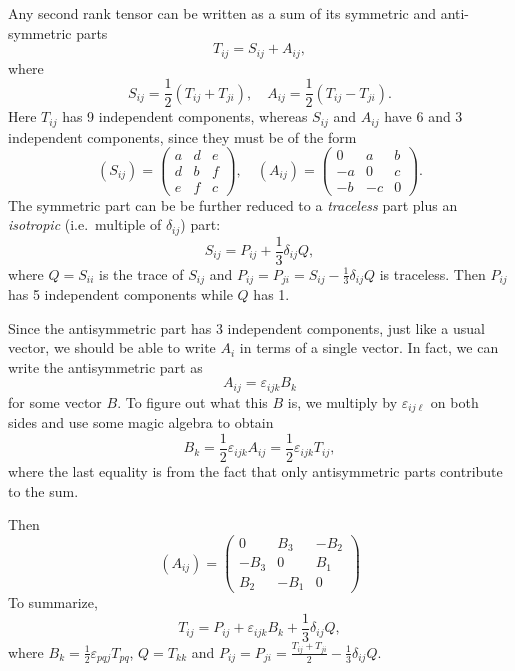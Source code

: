 \documentclass[a4paper]{article}
\begin{document}
Any second rank tensor can be written as a sum of its symmetric and anti-symmetric parts
\[
  T_{ij} = S_{ij} + A_{ij},
\]
where
\[
  S_{ij} = \frac{1}{2}(T_{ij} + T_{ji}),\quad A_{ij} = \frac{1}{2}(T_{ij} - T_{ji}).
\]
Here $T_{ij}$ has 9 independent components, whereas $S_{ij}$ and $A_{ij}$ have 6 and 3 independent components, since they must be of the form
\[
  (S_{ij}) =
  \begin{pmatrix}
    a & d & e\\
    d & b & f\\
    e & f & c
  \end{pmatrix}
  ,\quad
  (A_{ij}) =
  \begin{pmatrix}
    0 & a & b\\
    -a & 0 & c\\
    -b & -c & 0
  \end{pmatrix}.
\]
The symmetric part can be be further reduced to a \emph{traceless} part plus an \emph{isotropic} (i.e.\ multiple of $\delta_{ij}$) part:
\[
  S_{ij} = P_{ij} + \frac{1}{3}\delta_{ij} Q,
\]
where $Q = S_{ii}$ is the trace of $S_{ij}$ and $P_{ij} = P_{ji} = S_{ij} -\frac{1}{3}\delta_{ij}Q$ is traceless. Then $P_{ij}$ has 5 independent components while $Q$ has 1.

Since the antisymmetric part has 3 independent components, just like a usual vector, we should be able to write $A_{i}$ in terms of a single vector. In fact, we can write the antisymmetric part as
\[
  A_{ij} = \varepsilon_{ijk}B_k
\]
for some vector $B$. To figure out what this $B$ is, we multiply by $\varepsilon_{ij\ell}$ on both sides and use some magic algebra to obtain
\[
  B_k = \frac{1}{2}\varepsilon_{ijk}A_{ij} = \frac{1}{2}\varepsilon_{ijk}T_{ij},
\]
where the last equality is from the fact that only antisymmetric parts contribute to the sum.

Then
\[
  (A_{ij}) =
  \begin{pmatrix}
    0 & B_3 & -B_2\\
    -B_3 & 0 & B_1\\
    B_2 & -B_1 & 0
  \end{pmatrix}
\]
To summarize,
\[
  T_{ij} = P_{ij} + \varepsilon_{ijk}B_k + \frac{1}{3}\delta_{ij}Q,
\]
where $B_k = \frac{1}{2}\varepsilon_{pqj} T_{pq}$, $Q = T_{kk}$ and $P_{ij} = P_{ji} = \frac{T_{ij} + T_{ji}}{2} - \frac{1}{3}\delta_{ij}Q$.
\end{document}
